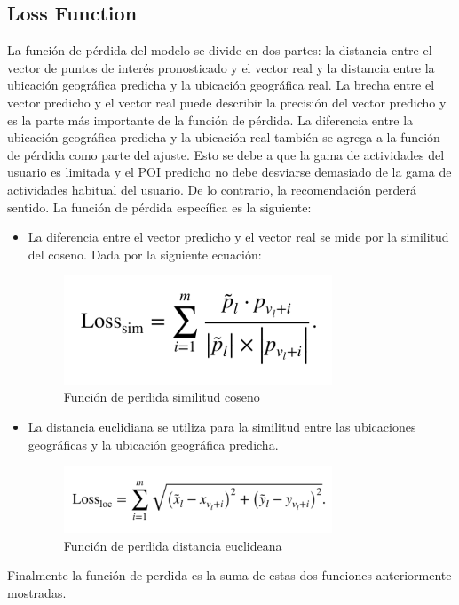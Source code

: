 \documentclass[sigplan,screen]{acmart}
\begin{document}
\subsection{Loss Function}
La función de pérdida del modelo se divide en dos partes: la distancia entre el vector de puntos de interés pronosticado y el vector real y la distancia entre la ubicación geográfica predicha y la ubicación geográfica real. La brecha entre el vector predicho y el vector real puede describir la precisión del vector predicho y es la parte más importante de la función de pérdida. La diferencia entre la ubicación geográfica predicha y la ubicación real también se agrega a la función de pérdida como parte del ajuste. Esto se debe a que la gama de actividades del usuario es limitada y el POI predicho no debe desviarse demasiado de la gama de actividades habitual del usuario. De lo contrario, la recomendación perderá sentido. La función de pérdida específica es la siguiente:
\begin{itemize}
    \item La diferencia entre el vector predicho y el vector real se mide por la similitud del coseno. Dada por la siguiente ecuación: 
    \begin{figure}[H]
    \includegraphics[width=8cm]{losim.png}
    \centering
    \caption{Función de perdida similitud coseno}
    \end{figure}

    \item La distancia euclidiana se utiliza para la similitud entre las ubicaciones geográficas y la ubicación geográfica predicha.
    \begin{figure}[H]
    \includegraphics[width=8cm]{losloc.png}
    \centering
    \caption{Función de perdida distancia euclideana}
    \end{figure}
\end{itemize}

Finalmente la función de perdida es la suma de estas dos funciones anteriormente mostradas. 
    
\end{document}
